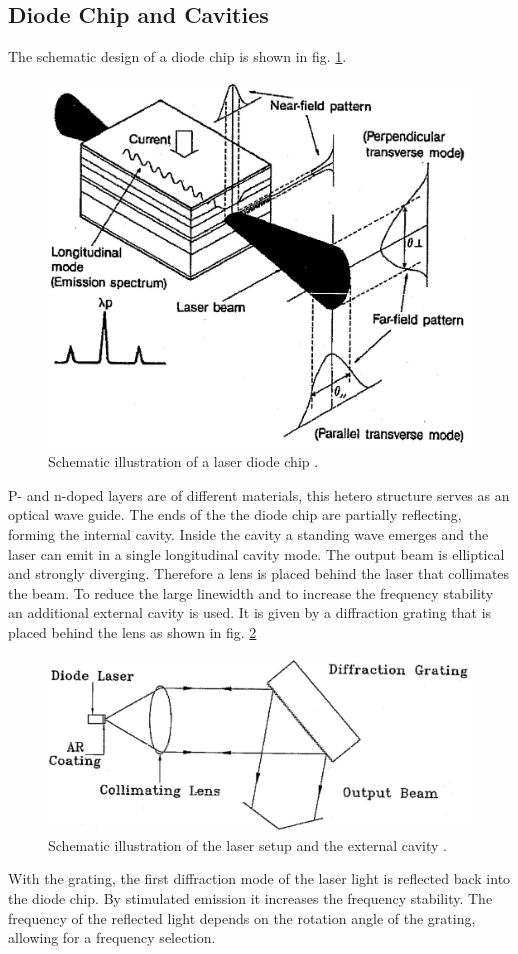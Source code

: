\subsection*{Diode Chip and Cavities}
The schematic design of a diode chip is shown in fig. \ref{fig:design}.
\begin{figure}
    \centering
    \includegraphics[width = 0.6\linewidth]{Bilder/design.jpeg}
    \caption{Schematic illustration of a laser diode chip \cite{sample}.}
    \label{fig:design}
\end{figure}
P- and n-doped layers are of different materials, this hetero structure serves as an optical wave guide.
The ends of the the diode chip are partially reflecting, forming the internal cavity. Inside the cavity a standing
wave emerges and the laser can emit in a single longitudinal cavity mode. 
The output beam is elliptical and strongly diverging. Therefore a lens is placed behind the laser that collimates
the beam.  To reduce the large linewidth and to increase the frequency stability an additional external cavity
is used. It is given by a diffraction grating that is placed behind the lens as shown in fig. \ref{fig:cavities}
\begin{figure}
    \centering
    \includegraphics[width = 0.8\linewidth]{Bilder/cavities.png}
    \caption{Schematic illustration of the laser setup and the external cavity \cite{sample}.}
    \label{fig:cavities}
\end{figure}
With the grating, the first diffraction mode of the laser light is reflected back into the diode chip. By stimulated 
emission it increases the frequency stability. The frequency of the reflected light depends on the rotation angle of 
the grating, allowing for a frequency selection.

